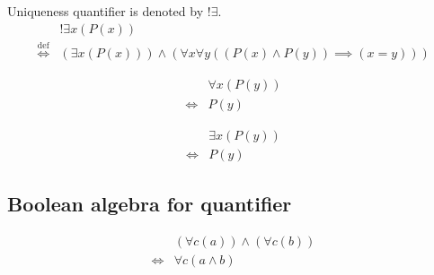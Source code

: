 \begin{defn}
\label{Definition:uniqueness_quantifier}
Uniqueness quantifier is denoted by $!\exists$.
\begin{align*}
& !\exists x (P(x)) \\
\overset{\operatorname{def}}{\iff} & (\exists x (P(x))) \land (\forall x \forall y ((P(x) \land P(y)) \implies (x = y)))
\end{align*}
\end{defn}

\begin{axm}
\label{Axiom:forall_independent_variable}
\begin{align*}
& \forall x (P(y)) \\
\iff & P(y)
\end{align*}
\end{axm}

\begin{axm}
\label{Axiom:exists_independent_variable}
\begin{align*}
& \exists x (P(y)) \\
\iff & P(y)
\end{align*}
\end{axm}

\subsection{Boolean algebra for quantifier}
\begin{prop}
\label{Proposition:forall_land_commutativity}
\begin{align*}
& (\forall c (a)) \land (\forall c (b)) \\
\iff & \forall c (a \land b)
\end{align*}
\end{prop}

